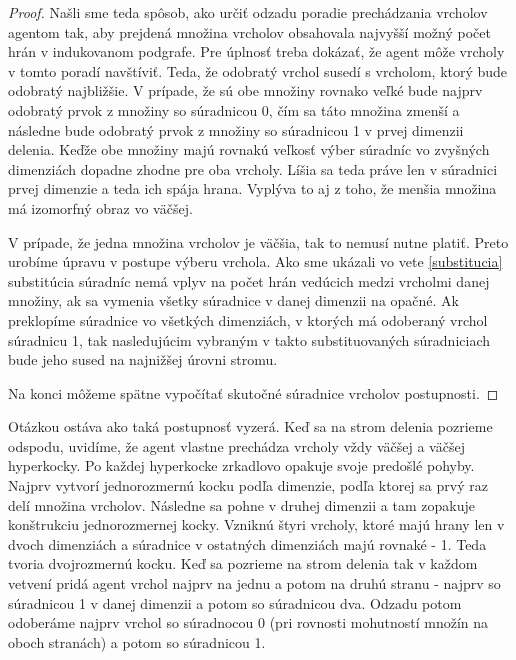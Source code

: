 \begin{proof}
Našli sme teda spôsob, ako určiť odzadu poradie prechádzania vrcholov
agentom tak, aby prejdená množina vrcholov obsahovala najvyšší možný počet
hrán v indukovanom podgrafe. Pre úplnosť treba dokázať, že agent môže
vrcholy v tomto poradí navštíviť. Teda, že odobratý vrchol susedí s
vrcholom, ktorý bude odobratý najbližšie.
V prípade, že sú obe množiny rovnako veľké bude najprv odobratý prvok z
množiny so súradnicou 0, čím sa táto množina zmenší a následne bude odobratý
prvok z množiny so súradnicou 1 v prvej dimenzii delenia. Keďže obe množiny
majú rovnakú veľkosť výber súradníc vo zvyšných dimenziách dopadne zhodne
pre oba vrcholy. Líšia sa teda práve len v súradnici prvej dimenzie a teda ich
spája hrana. Vyplýva to aj z toho, že menšia množina má izomorfný obraz vo
väčšej.

V prípade, že jedna množina vrcholov je väčšia, tak to nemusí nutne platiť.
Preto urobíme úpravu v postupe výberu vrchola. Ako sme ukázali vo vete
\ref{substitucia} substitúcia súradníc nemá vplyv na počet hrán vedúcich
medzi vrcholmi danej množiny, ak sa vymenia všetky súradnice v danej
dimenzii na opačné. Ak preklopíme súradnice vo všetkých dimenziách, v
ktorých má odoberaný vrchol súradnicu 1, tak nasledujúcim vybraným v takto
substituovaných súradniciach bude jeho sused na najnižšej úrovni stromu.

Na konci môžeme spätne vypočítať skutočné súradnice vrcholov postupnosti.
\end{proof}

Otázkou ostáva ako taká postupnosť vyzerá. Keď sa na strom delenia pozrieme
odspodu, uvidíme, že agent vlastne prechádza vrcholy vždy väčšej a väčšej 
hyperkocky.
Po každej hyperkocke zrkadlovo opakuje svoje predošlé pohyby. Najprv vytvorí
jednorozmernú kocku podľa dimenzie, podľa ktorej sa prvý raz delí množina
vrcholov. Následne sa pohne v druhej dimenzii a tam zopakuje konštrukciu
jednorozmernej kocky. Vzniknú štyri vrcholy, ktoré majú hrany len v dvoch
dimenziách a súradnice v ostatných dimenziách majú rovnaké - 1. Teda tvoria
dvojrozmernú kocku. Keď sa pozrieme na strom delenia tak v každom vetvení
pridá agent vrchol najprv na jednu a potom na druhú stranu - najprv so
súradnicou 1 v danej dimenzii a potom so súradnicou dva. Odzadu potom
odoberáme najprv vrchol so súradnocou 0 (pri rovnosti mohutností množín 
na oboch stranách) a potom so súradnicou 1.

